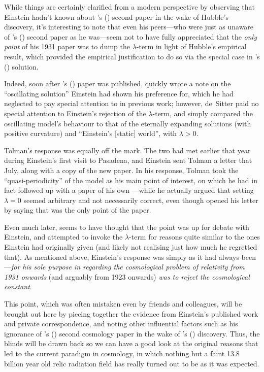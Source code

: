 \documentclass[12 pt]{article}
\def\citeapos#1{\citeauthor{#1}'s (\citeyear{#1})}
\begin{document}
While things are certainly clarified from a modern perspective by observing that Einstein hadn't known about \citeapos{Friedmann1924} second paper in the wake of Hubble's discovery, it's interesting to note that even his peers---who were just as unaware of \citeapos{Friedmann1924} second paper as he was---seem not to have fully appreciated that the \textit{only point} of his 1931 paper was to dump the $\lambda$-term in light of Hubble's empirical result, which provided the empirical justification to do so via the special case in \citeapos{Friedmann1922} solution. 

Indeed, soon after \citeapos{Einstein1931a} paper was published, \citet{deSitter1931} quickly wrote a note on the ``oscillating solution'' Einstein had shown his preference for, which he had neglected to pay special attention to in previous work; however, de~Sitter paid no special attention to Einstein's rejection of the $\lambda$-term, and simply compared the oscillating model's behaviour to that of the eternally expanding solutions (with positive curvature) and ``Einstein's [static] world'', with $\lambda>0$.

Tolman's response was equally off the mark. The two had met earlier that year during Einstein's first visit to Pasadena, and Einstein sent Tolman a letter that July, along with a copy of the new paper. In his response, Tolman took the ``quasi-periodicity'' of the model as his main point of interest, on which he had in fact followed up with a paper of his own \citep{Tolman1931b}---while he actually argued that setting $\lambda=0$ seemed arbitrary and not necessarily correct, even though \citet{Einstein1931b} opened his letter by saying that was the only point of the paper. 

Even much later, \citet{Lemaitre1949a} seems to have thought that the point was up for debate with Einstein, and attempted to invoke the $\lambda$-term for reasons quite similar to the ones Einstein had originally given (and likely not realising just how much he regretted that). As mentioned above, Einstein's response was simply as it had always been---\textit{for his sole purpose in regarding the cosmological problem of relativity from 1931 onwards} (and arguably from 1923 onwards) \textit{was to reject the cosmological constant}. 

This point, which was often mistaken even by friends and colleagues, will be brought out here by piecing together the evidence from Einstein's published work and private correspondence, and noting other influential factors such as his ignorance of \citeapos{Friedmann1924} second cosmology paper in the wake of \citeapos{Hubble1929} discovery. Thus, the blinds will be drawn back so we can have a good look at the original reasons that led to the current paradigm in cosmology, in which nothing but a faint 13.8 billion year old relic radiation field has really turned out to be as it was expected.  
\end{document}
